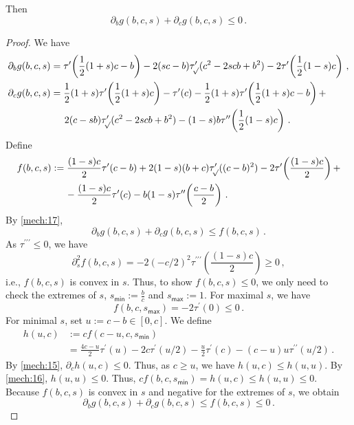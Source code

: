 \documentclass{article}
\newcommand{\lb}{\left(} %
\newcommand{\rb}{\right)} %
\newcommand{\br}[1]{\lb #1 \rb} %
\newcommand{\brOf}[1]{\!\br{#1}} %
\newcommand*{\ms}[1]{\mathsf{#1}}
\newcommand{\pr}{^\prime}
\newcommand{\prr}{^{\prime\prime}}
\newcommand{\prrr}{^{\prime\prime\prime}}
\newcommand{\equationFullstop}{\, .}
\newcommand{\eqfs}{\equationFullstop}
\newcommand{\equationComma}{\, ,}
\newcommand{\eqcm}{\equationComma}
\newcommand{\tran}{\tau}
\newcommand{\trans}{\tran_{\!\sqrt{}}}
\newcommand{\dtrans}{\trans\pr}
\newcommand{\dtran}{\tran\pr}
\newcommand{\ddtran}{\tran\prr}
\newcommand{\dddtran}{\tran\prrr}
\newcommand{\nega}{\leq0}
\begin{document}
\begin{appendix}
\begin{lemma}
\begin{equation*}
	\end{equation*}
	Then
	\begin{equation*}
		\partial_b g(b,c,s)  + \partial_c g(b,c,s) \leq 0\eqfs
	\end{equation*}
\end{lemma}
%
\begin{proof}
	We have
	\begin{align*}
		\partial_b g(b,c,s) 
		&=
		\dtran\brOf{\frac12(1+s)c - b} - 2(sc-b)\dtrans(c^2-2scb+b^2) - 2\dtran\brOf{\frac12(1-s)c}\eqcm
		\\
		\partial_c g(b,c,s) 
		&=
		\frac12(1+s)\dtran\brOf{\frac12(1+s)c} - \dtran(c) - \frac12(1+s)\dtran\brOf{\frac12(1+s)c - b} + 
		\\&\hphantom{=}\ \ 2(c-sb)\dtrans(c^2-2scb+b^2) - (1-s)b\ddtran\brOf{\frac12(1-s)c}
		\eqfs
	\end{align*}
	Define 
	\begin{align*}
		f(b,c,s) &:= \frac{(1-s)c}2\dtran( c-b)
		+ 2(1-s)(b+c)\dtrans( (c-b)^2)
		- 2\dtran\brOf{\frac{(1-s)c}2} 
		+ 
		\\&\hphantom{=}\ \ 
		-\frac{(1-s)c}2\dtran( c)
		- b(1-s)\ddtran\brOf{\frac{c-b}2}
		\eqfs
	\end{align*}
	By \cref{mech:17}, 
	\begin{equation}
		\partial_b g(b,c,s) + \partial_c g(b,c,s) \leq f(b,c,s)\eqfs
	\end{equation}
	As $\dddtran\nega$, we have
	\begin{equation*}
		\partial_s^2 f(b,c,s) =
		- 2 (-c/2)^2\dddtran\brOf{\frac{(1-s)c}2}
		\geq 0		
		\eqcm
	\end{equation*}
	i.e., $f(b,c,s) $ is convex in $s$. Thus, to show $f(b,c,s) \leq 0$, we only need to check the extremes of $s$, $s_{\ms{min}} := \frac bc$ and $s_{\ms{max}} := 1$. For maximal $s$, we have
	\begin{equation*}
		f(b,c,s_{\ms{max}}) = - 2\dtran(0) \leq 0
		\eqfs
	\end{equation*}
	For minimal $s$, set $u := c-b\in[0,c]$. We define
	\begin{align*}
		h(u,c) &:=
		c f(c-u, c, s_{\ms{min}})
		\\&=
		\frac{4c-u}2\dtran(u)
		- 2c\dtran(u/2)
		- \frac u2 \dtran(c)
		- (c-u)u\ddtran(u/2)
		\eqfs
	\end{align*}
	By \cref{mech:15}, $\partial_c h(u,c) \leq 0$. Thus, as $c \geq u$, we have $h(u,c) \leq	h(u,u)$.
	By \cref{mech:16}, $h(u,u) \leq 0$.
	Thus, $c f(b, c, s_{\ms{min}}) = h(u,c) \leq h(u,u) \leq 0$.
	Because $ f(b,c,s)$ is convex in $s$ and negative for the extremes of $s$, we obtain
	\begin{equation*}
		\partial_b g(b,c,s)  + \partial_c g(b,c,s) \leq f(b,c,s)  \leq 0
		\eqfs
	\end{equation*}
\end{proof}
%
%
%

\end{appendix}
\end{document}
